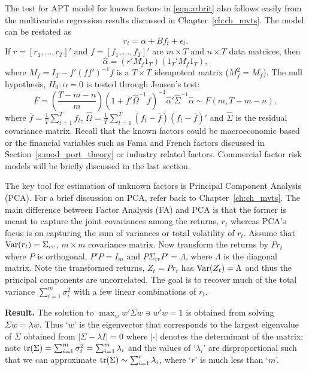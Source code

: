 The test for APT model for known factors in \eqref{eqn:arbrit} also follows easily from the multivariate regression results discussed in Chapter~\ref{ch:ch_mvts}. The model can be restated as
	\begin{equation} \label{eqn:5rtalpha}
	r_t = \alpha + B f_t + \epsilon_t.
	\end{equation}
If $r =[r_1, \ldots, r_T]'$ and $f= [f_1, \ldots, f_T]'$ are $m \times T$ and $n \times T$ data matrices, then
	\begin{equation}\label{eqn:5hatalpha}
	\hat{\alpha}= (r' M_f 1_T)(1_T'  M_f 1_T),
	\end{equation}	
where $M_f=I_T - f'(ff')^{-1}f$ is a $T \times T$ idempotent matrix ($M_f^2= M_f$). The null hypothesis, $H_0: \alpha= 0$ is tested through Jensen's test:
	\begin{equation}\label{eqn:bigF}
	F= \left( \dfrac{T - m - n}{m} \right) (1 + \overline{f}' \hat{\Omega}^{-1} \overline{f})^{-1} \hat{\alpha}' \hat{\Sigma}^{-1} \hat{\alpha} \sim F(m,T - m - n),
	\end{equation}	
where $\overline{f}= \frac{1}{T} \sum_{t=1}^T f_t$, $\hat{\Omega}= \frac{1}{T} \sum_{t=1}^T (f_t - \overline{f})(f_t - \overline{f})'$ and $\hat{\Sigma}$ is the residual covariance matrix. Recall that the known factors could be macroeconomic based or the financial variables such as Fama and French factors discussed in Section~\ref{s:mod_port_theory} or industry related factors. Commercial factor risk models will be briefly discussed in the last section.


The key tool for estimation of unknown factors is Principal Component Analysis (PCA). For a brief discussion on PCA, refer back to Chapter~\ref{ch:ch_mvts}. The main difference between Factor Analysis (FA) and PCA is that the former is meant to capture the joint covariances among the returns, $r_t$ whereas PCA's focus is on capturing the sum of variances or total volatility of $r_t$. Assume that $\operatorname{Var}(r_t)= \Sigma_{rr}$, $m \times m$ covariance matrix. Now transform the returns by $Pr_t$ where $P$ is orthogonal, $P'P=I_m$ and $P\Sigma_{rr}P'= \Lambda$, where $\Lambda$ is the diagonal matrix. Note the transformed returns, $Z_t= Pr_t$ has $\operatorname{Var}(Z_t)= \Lambda$ and thus the principal components are uncorrelated. The goal is to recover much of the total variance $\sum_{i=1}^m \sigma_i^2$ with a few linear combinations of $r_t$. \twomedskip


\noindent\textbf{Result. } The solution to $\max_w w' \Sigma w \ni w'w=1$ is obtained from solving $\Sigma w= \lambda w$. Thus `$w$' is the eigenvector that corresponds to the largest eigenvalue of $\Sigma$ obtained from $\lvert \Sigma - \lambda I\rvert=0$ where $|\cdot|$ denotes the determinant of the matrix; note $\operatorname{tr}(\Sigma)= \sum_{i=1}^m \sigma_i^2 = \sum_{i=1}^m \lambda_i$ and the values of `$\lambda_i$' are disproportional such that we can approximate $\operatorname{tr}(\Sigma) \sim \sum_{i=1}^r \lambda_i$, where `$r$' is much less than `$m$'. \twomedskip
	
